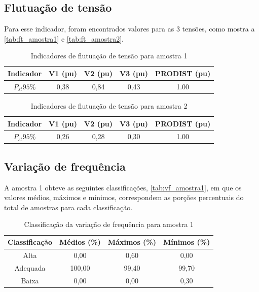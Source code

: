 \subsection{Flutuação de tensão}

Para esse indicador, foram encontrados valores para as 3 tensões, como mostra a \autoref{tab:ft_amostra1} e \autoref{tab:ft_amostra2}.

\begin{table}[H]
  \centering
  \caption{Indicadores de flutuação de tensão para amostra 1}
  \label{tab:ft_amostra1}
  \begin{tabular}{@{}ccccc@{}}
    \toprule
    Indicador & V1 (pu) & V2 (pu) & V3 (pu) & PRODIST  (pu) \\
    \midrule
    $P_{st}95\%$   & 0,38 & 0,84 & 0,43 & 1.00 \\
    \bottomrule
  \end{tabular}
\end{table}


\begin{table}[H]
  \centering
  \caption{Indicadores de flutuação de tensão para amostra 2}
  \label{tab:ft_amostra2}
  \begin{tabular}{@{}ccccc@{}}
    \toprule
    Indicador & V1 (pu) & V2 (pu) & V3 (pu) & PRODIST  (pu) \\
    \midrule
    $P_{st}95\%$   & 0,26 & 0,28 & 0,30 & 1.00 \\
    \bottomrule
  \end{tabular}
\end{table}

\subsection{Variação de frequência}

A amostra 1 obteve as seguintes classificações, \autoref{tab:vf_amostra1}, em que os valores médios, máximos e mínimos, correspondem as porções percentuais do total de amostras para cada classificação.

\begin{table}[H]
  \centering
  \caption{Classificação da variação de frequência para amostra 1}
  \label{tab:vf_amostra1}
  \begin{tabular}{@{}cccc@{}}
    \toprule
    Classificação & Médios (\%) & Máximos (\%) & Mínimos (\%) \\
    \midrule
    Alta & 0,00 & 0,60 & 0,00 \\
    Adequada & 100,00 & 99,40 & 99,70 \\
    Baixa & 0,00 & 0,00 & 0,30 \\
    \bottomrule
  \end{tabular}
\end{table}

